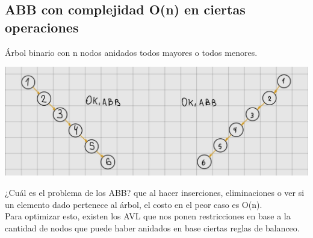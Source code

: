 \documentclass[10pt,a4paper]{article}
\begin{document}
\subsection*{ABB con complejidad O(n) en ciertas operaciones}
Árbol binario con n nodos anidados todos mayores o todos menores.
\begin{center}
    \begin{minipage}[b]{0.7\textwidth}
        \includegraphics[width=\linewidth]{assets/peor_caso_abb.jpg}
        \centering
        \label{fig:peor_caso_abb}
    \end{minipage}
\end{center}
¿Cuál es el problema de los ABB? que al hacer inserciones, eliminaciones o ver si un elemento dado pertenece al árbol, el costo en el peor caso es O(n). \\ 
Para optimizar esto, existen los AVL que nos ponen restricciones en base a la cantidad de nodos que puede haber anidados en base ciertas reglas de balanceo.
\end{document}
